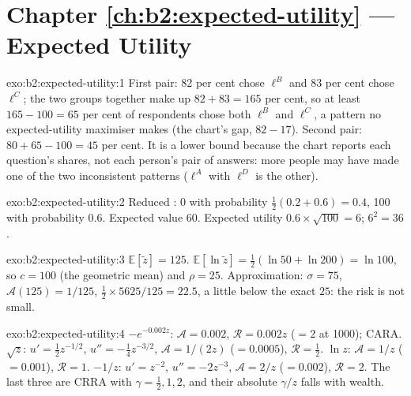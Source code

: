 \section*{Chapter \ref{ch:b2:expected-utility} --- Expected Utility}

\begin{solution}{exo:b2:expected-utility:1}
First pair: 82 per cent chose $\ell^{B}$ and 83 per cent chose $\ell^{C}$; the two groups together
make up $82 + 83 = 165$ per cent, so at least $165 - 100 = 65$ per cent of respondents chose both
$\ell^{B}$ and $\ell^{C}$, a pattern no expected-utility maximiser makes (the chart's gap, $82 - 17$).
Second pair: $80 + 65 - 100 = 45$ per cent. It is a lower bound because the chart reports each
question's shares, not each person's pair of answers: more people may have made one of the two
inconsistent patterns ($\ell^{A}$ with $\ell^{D}$ is the other).
\end{solution}

\begin{solution}{exo:b2:expected-utility:2}
Reduced : $0$ with probability $\tfrac12(0.2 + 0.6) = 0.4$, \num{100} with probability $0.6$.
Expected value $60$. Expected utility $0.6 \times \sqrt{100} = 6$;  $6^2 = 36$.
\end{solution}

\begin{solution}{exo:b2:expected-utility:3}
$\mathbb{E}[\tilde z] = 125$. $\mathbb{E}[\ln\tilde z] = \tfrac12(\ln 50 + \ln 200) = \ln 100$, so $c =
100$ (the geometric mean) and $\rho = 25$. Approximation: $\sigma = 75$, $\mathcal{A}(125) = 1/125$,
$\tfrac12 \times 5625/125 = 22.5$, a little below the exact $25$: the risk is not small.
\end{solution}

\begin{solution}{exo:b2:expected-utility:4}
$-e^{-0.002z}$: $\mathcal{A} = 0.002$, $\mathcal{R} = 0.002z$ ($= 2$ at \num{1000}); CARA.
$\sqrt z$: $u' = \tfrac12 z^{-1/2}$, $u'' = -\tfrac14 z^{-3/2}$, $\mathcal{A} = 1/(2z)$ ($= 0.0005$),
$\mathcal{R} = \tfrac12$. $\ln z$: $\mathcal{A} = 1/z$ ($= 0.001$), $\mathcal{R} = 1$. $-1/z$: $u' =
z^{-2}$, $u'' = -2z^{-3}$, $\mathcal{A} = 2/z$ ($= 0.002$), $\mathcal{R} = 2$. The last three are CRRA
with $\gamma = \tfrac12, 1, 2$, and their absolute  $\gamma/z$ falls with wealth.
\end{solution}


